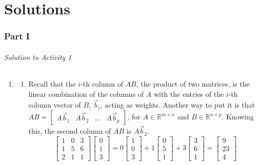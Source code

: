\part{Solutions}

\section{Part I}
\paragraph{Solution to Activity 1}
\begin{enumerate}
	\item \begin{enumerate}
	\item Recall that the \(i\)-th column of \(AB\), the product of two matrices, is the linear combination of the columns of \(A\) with the entries of the \(i\)-th 
		column vector of \(B\), \(\vec{b}_i\), acting as weights. Another way to put it is that
		\(AB = \begin{bmatrix}A\vec{b}_1 & A\vec{b}_2 & \dots & A\vec{b}_p\end{bmatrix}\), for
		\(A \in \mathbb{R}^{m \times n}\) and \(B \in \mathbb{R}^{n \times p}\). Knowing this, the second column of \(AB\) is \(A\vec{b}_2\).
		\[\begin{bmatrix}1 & 0 & 3 \\ 1 & 5 & 6 \\ 2 & 1 & 1\end{bmatrix}\begin{bmatrix}0 \\ 1 \\ 3\end{bmatrix} 
		  = 0\begin{bmatrix}1 \\ 0 \\ 3\end{bmatrix} + 1\begin{bmatrix}0 \\ 5 \\ 1\end{bmatrix} + 3\begin{bmatrix}3 \\ 6 \\ 1\end{bmatrix}
		  = \begin{bmatrix}9 \\ 23 \\ 4\end{bmatrix}\]

\end{enumerate}
\end{enumerate}
